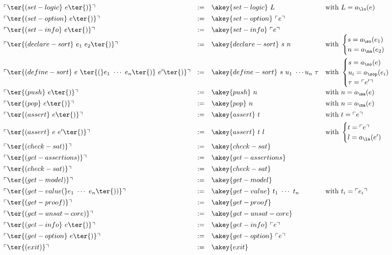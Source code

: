 \(
\begin{array}{llll}
 \tr{\ter{(set-logic}\ e \ter{)}} & := & \akey{set-logic}\ L
 & \text{with } L = a_{\lo}(e)
 \\[1ex] 
 \tr{\ter{(set-option}\ e \ter{)}} & := & \akey{set-option}\ \tr{e}
 \\[1ex] 
 \tr{\ter{(set-info}\ e \ter{)}} & := & \akey{set-info}\ \tr{e}
 \\ 
 \tr{\ter{(declare-sort}\ e_1\ e_2 \ter{)}} & := & \akey{declare-sort}\ s\ n
 & \text{with } \begin{cases} s = a_{\so}(e_1)\\ n = a_{\na}(e_2)\end{cases}
 \\[3ex] 
 \tr{\ter{(define-sort}\ e\ \ter{(}e_1\ \cdots\ e_n \ter{)}\ e'\ter{)}} & := & \akey{define-sort}\ s\ u_1\ \cdots u_n\ \tau
 & \text{with } 
   \begin{cases}
    s = a_{\so}(e)\\
    u_i = a_{\sop}(e_i)\\
    \tau = \tr{e'}\\
   \end{cases}
 \\[4ex] 
 \tr{\ter{(push}\ e \ter{)}} & := & \akey{push}\ n
 & \text{with } n = a_{\na}(e)
 \\[1ex] 
 \tr{\ter{(pop}\ e \ter{)}} & := & \akey{pop}\ n
 & \text{with } n = a_{\na}(e)
 \\[1ex] 
 \tr{\ter{(assert}\ e \ter{)}} & := & \akey{assert}\ t
 & \text{with } t = \tr{e}
 \\[1ex] 
 \tr{\ter{(assert}\ e\ e' \ter{)}} & := & \akey{assert}\ t\ l
 & \text{with } \begin{cases}t = \tr{e}\\ l = a_{\la}(e')\end{cases}
 \\[1ex] 
 \tr{\ter{(check-sat)}} & := & \akey{check-sat}
 \\[1ex] 
 \tr{\ter{(get-assertions)}} & := & \akey{get-assertions}
 \\[1ex] 
 \tr{\ter{(check-sat)}} & := & \akey{check-sat}
 \\[1ex] 
 \tr{\ter{(get-model)}} & := & \akey{get-model}
 \\[1ex] 
 \tr{\ter{(get-value (} e_1\ \cdots\ e_n\ter{))}} & := & \akey{get-value}\ t_1\ \cdots\ t_n
  & \text{with } t_i = \tr{e_i}
 \\[1ex] 
 \tr{\ter{(get-proof)}} & := & \akey{get-proof}
 \\[1ex] 
 \tr{\ter{(get-unsat-core)}} & := & \akey{get-unsat-core}
 \\[1ex] 
 \tr{\ter{(get-info}\ e \ter{)}} & := & \akey{get-info}\ \tr{e}
 \\[1ex] 
 \tr{\ter{(get-option}\ e \ter{)}} & := & \akey{get-option}\ \tr{e}
 \\[1ex] 
 \tr{\ter{(exit)}} & := & \akey{exit}
\end{array}
\)
\bigskip

